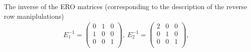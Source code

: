 \begin{example}
The inverse of the ERO matrices (corresponding to the description of the reverse row maniplulations)
\begin{eqnarray*}
E_1^{-1}
= \left(\begin{array}{ccc}
0  &1 &0\\
1  &0 &0\\ 
0  &0 &1\\
\end{array}  \right)
,~
E_2^{-1}
= \left(\begin{array}{ccc}
2  &0 &0\\
0  &1 &0\\ 
0  &0 &1\\
\end{array}  \right) , ~

\end{eqnarray*}
\end{example}
